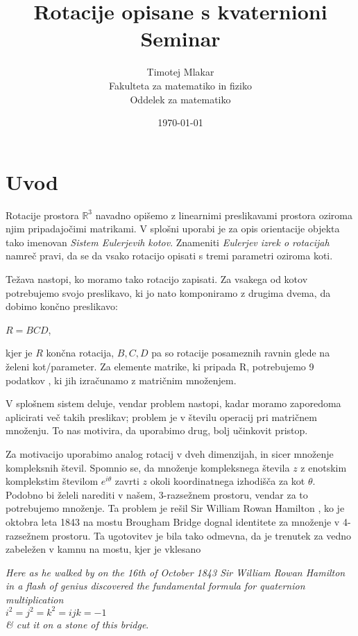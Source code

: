 \documentclass[a4paper,12pt]{article}
\title{Rotacije opisane s kvaternioni \\ 
\Large Seminar}
\author{Timotej Mlakar \\
Fakulteta za matematiko in fiziko \\
Oddelek za matematiko}
\date{\today}
\def\R{\mathbb{R}} %
\begin{document}


\maketitle



\section{Uvod}

Rotacije prostora $\R^3$ navadno opišemo z linearnimi preslikavami prostora oziroma njim pripadajočimi matrikami.
V splošni uporabi je za opis orientacije objekta tako imenovan \emph{Sistem Eulerjevih kotov}. Znameniti \emph{Eulerjev izrek o rotacijah} namreč pravi,
da se da vsako rotacijo opisati s tremi parametri oziroma koti.

Težava nastopi, ko moramo tako rotacijo zapisati. Za vsakega od kotov potrebujemo svojo preslikavo, ki jo
nato komponiramo z drugima dvema, da dobimo končno preslikavo:
\begin{center}
   $R = BCD$,
\end{center}
kjer je $R$ končna rotacija, $B, C, D$ pa so rotacije posameznih ravnin glede na želeni kot/parameter.
Za elemente matrike, ki pripada R, potrebujemo 9  podatkov \cite{salamin1979application}, ki jih izračunamo z matričnim množenjem.

V splošnem sistem deluje, vendar problem nastopi, kadar moramo zaporedoma aplicirati več takih preslikav; 
problem je v številu operacij pri matričnem množenju. To nas motivira, da uporabimo drug, bolj učinkovit pristop.

Za motivacijo uporabimo analog rotacij v dveh dimenzijah, in sicer množenje kompleksnih števil.
Spomnio se, da množenje kompleksnega števila $z$ z enotskim komplekstim številom $e^{i\theta}$ zavrti $z$ okoli koordinatnega izhodišča za kot $\theta$.
Podobno bi želeli narediti v našem, 3-razsežnem prostoru, vendar za to potrebujemo množenje.
Ta problem je rešil Sir William Rowan Hamilton \cite{shoemake1985animating}, ko je oktobra leta 1843 na mostu Brougham Bridge dognal identitete za množenje v 4-razsežnem prostoru.
Ta ugotovitev je bila tako odmevna, da je trenutek za vedno zabeležen v kamnu na mostu, kjer je vklesano
\begin{center}
   \emph{ Here as he walked by
   on the 16th of October 1843
   Sir William Rowan Hamilton
   in a flash of genius discovered
   the fundamental formula for
   quaternion multiplication}\\
   $i^2 = j^2 = k^2 = ijk = -1$\\
   \emph{ \& cut it on a stone of this bridge}. ~\cite{baez2004baezstuff}
\end{center}
\end{document}
